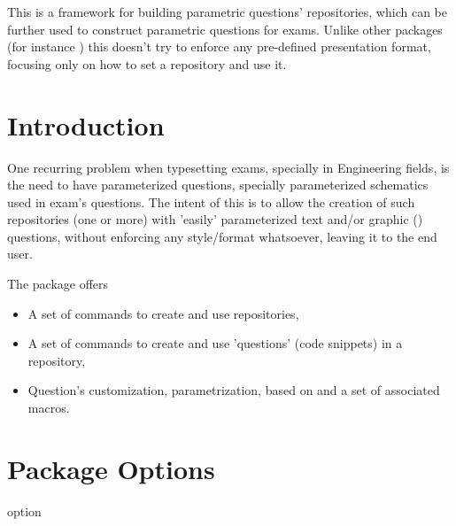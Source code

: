 \documentclass[10pt]{article}
\begin{document}
  
\begin{typesetabstract}

This is a framework for building parametric questions' repositories, which can be further used to construct parametric questions for exams. Unlike other packages (for instance ) this doesn't try to enforce any pre-defined presentation format, focusing only on how to set a repository and use it.
\end{typesetabstract}

\tableofcontents

\section{Introduction}
One recurring problem when typesetting exams, specially in Engineering fields, is the need to have parameterized questions, specially parameterized schematics used in exam's questions. The intent of this is to allow the creation of such repositories (one or more) with 'easily' parameterized text and/or graphic () questions, without enforcing any style/format whatsoever, leaving it to the end user.

The package offers
\begin{itemize}
  \item A set of commands to create and use repositories,
  \item A set of commands to create and use 'questions' (code snippets) in a repository,
  \item Question's customization, parametrization, based on  and a set of associated macros.
\end{itemize}

\section{Package Options}\label{package options}
\begin{describelist}{option}
\end{describelist}
\end{document}
